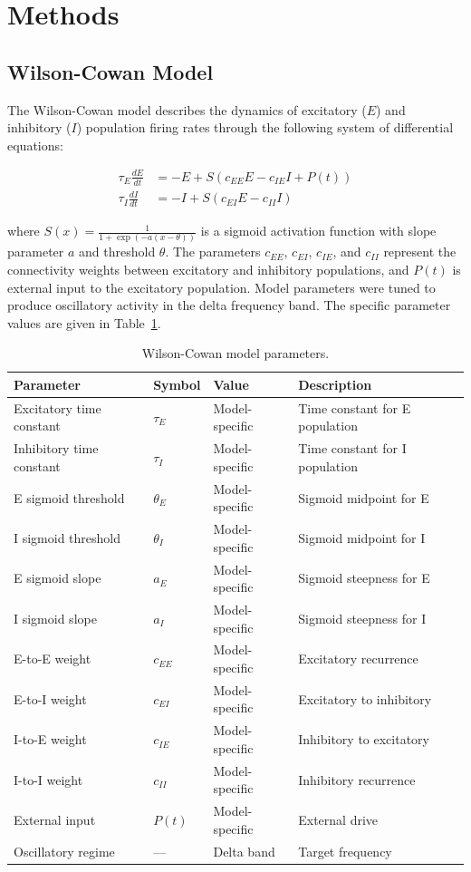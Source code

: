 \documentclass[12pt]{article}
\begin{document}
\section{Methods}

\subsection{Wilson-Cowan Model}

The Wilson-Cowan model describes the dynamics of excitatory ($E$) and inhibitory ($I$) population firing rates through the following system of differential equations:

\begin{align}
\tau_E \frac{dE}{dt} &= -E + S\left(c_{EE} E - c_{IE} I + P(t)\right) \\
\tau_I \frac{dI}{dt} &= -I + S\left(c_{EI} E - c_{II} I\right)
\end{align}

\noindent where $S(x) = \frac{1}{1 + \exp(-a(x - \theta))}$ is a sigmoid activation function with slope parameter $a$ and threshold $\theta$. The parameters $c_{EE}$, $c_{EI}$, $c_{IE}$, and $c_{II}$ represent the connectivity weights between excitatory and inhibitory populations, and $P(t)$ is external input to the excitatory population. Model parameters were tuned to produce oscillatory activity in the delta frequency band. The specific parameter values are given in Table~\ref{tab:wc_params}.

\begin{table}[H]
\centering
\caption{Wilson-Cowan model parameters.}
\label{tab:wc_params}
\begin{tabular}{llll}
\toprule
Parameter & Symbol & Value & Description \\
\midrule
Excitatory time constant & $\tau_E$ & Model-specific & Time constant for E population \\
Inhibitory time constant & $\tau_I$ & Model-specific & Time constant for I population \\
E sigmoid threshold & $\theta_E$ & Model-specific & Sigmoid midpoint for E \\
I sigmoid threshold & $\theta_I$ & Model-specific & Sigmoid midpoint for I \\
E sigmoid slope & $a_E$ & Model-specific & Sigmoid steepness for E \\
I sigmoid slope & $a_I$ & Model-specific & Sigmoid steepness for I \\
E-to-E weight & $c_{EE}$ & Model-specific & Excitatory recurrence \\
E-to-I weight & $c_{EI}$ & Model-specific & Excitatory to inhibitory \\
I-to-E weight & $c_{IE}$ & Model-specific & Inhibitory to excitatory \\
I-to-I weight & $c_{II}$ & Model-specific & Inhibitory recurrence \\
External input & $P(t)$ & Model-specific & External drive \\
Oscillatory regime & --- & Delta band & Target frequency \\
\bottomrule
\end{tabular}
\end{table}
\end{document}
